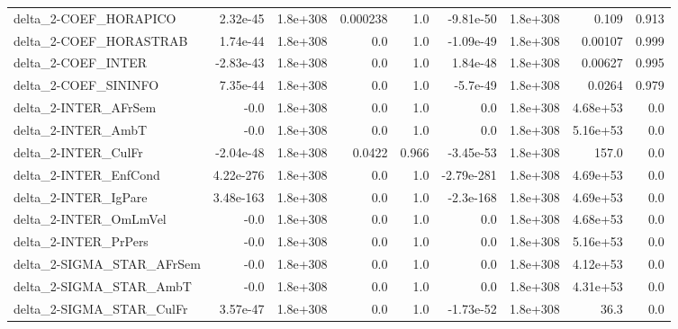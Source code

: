 \begin{tabular}{lrrrrrrrr}
delta\_2-COEF\_HORAPICO                 &    2.32e-45 &     1.8e+308 &   0.000238 &      1.0 &  -9.81e-50 &    1.8e+308 &        0.109 &         0.913 \\
delta\_2-COEF\_HORASTRAB                &    1.74e-44 &     1.8e+308 &        0.0 &      1.0 &  -1.09e-49 &    1.8e+308 &      0.00107 &         0.999 \\
delta\_2-COEF\_INTER                    &   -2.83e-43 &     1.8e+308 &        0.0 &      1.0 &   1.84e-48 &    1.8e+308 &      0.00627 &         0.995 \\
delta\_2-COEF\_SININFO                  &    7.35e-44 &     1.8e+308 &        0.0 &      1.0 &   -5.7e-49 &    1.8e+308 &       0.0264 &         0.979 \\
delta\_2-INTER\_AFrSem                  &        -0.0 &     1.8e+308 &        0.0 &      1.0 &        0.0 &    1.8e+308 &     4.68e+53 &           0.0 \\
delta\_2-INTER\_AmbT                    &        -0.0 &     1.8e+308 &        0.0 &      1.0 &        0.0 &    1.8e+308 &     5.16e+53 &           0.0 \\
delta\_2-INTER\_CulFr                   &   -2.04e-48 &     1.8e+308 &     0.0422 &    0.966 &  -3.45e-53 &    1.8e+308 &        157.0 &           0.0 \\
delta\_2-INTER\_EnfCond                 &   4.22e-276 &     1.8e+308 &        0.0 &      1.0 & -2.79e-281 &    1.8e+308 &     4.69e+53 &           0.0 \\
delta\_2-INTER\_IgPare                  &   3.48e-163 &     1.8e+308 &        0.0 &      1.0 &  -2.3e-168 &    1.8e+308 &     4.69e+53 &           0.0 \\
delta\_2-INTER\_OmLmVel                 &        -0.0 &     1.8e+308 &        0.0 &      1.0 &        0.0 &    1.8e+308 &     4.68e+53 &           0.0 \\
delta\_2-INTER\_PrPers                  &        -0.0 &     1.8e+308 &        0.0 &      1.0 &        0.0 &    1.8e+308 &     5.16e+53 &           0.0 \\
delta\_2-SIGMA\_STAR\_AFrSem             &        -0.0 &     1.8e+308 &        0.0 &      1.0 &        0.0 &    1.8e+308 &     4.12e+53 &           0.0 \\
delta\_2-SIGMA\_STAR\_AmbT               &        -0.0 &     1.8e+308 &        0.0 &      1.0 &        0.0 &    1.8e+308 &     4.31e+53 &           0.0 \\
delta\_2-SIGMA\_STAR\_CulFr              &    3.57e-47 &     1.8e+308 &        0.0 &      1.0 &  -1.73e-52 &    1.8e+308 &         36.3 &           0.0 \\

\end{tabular}
